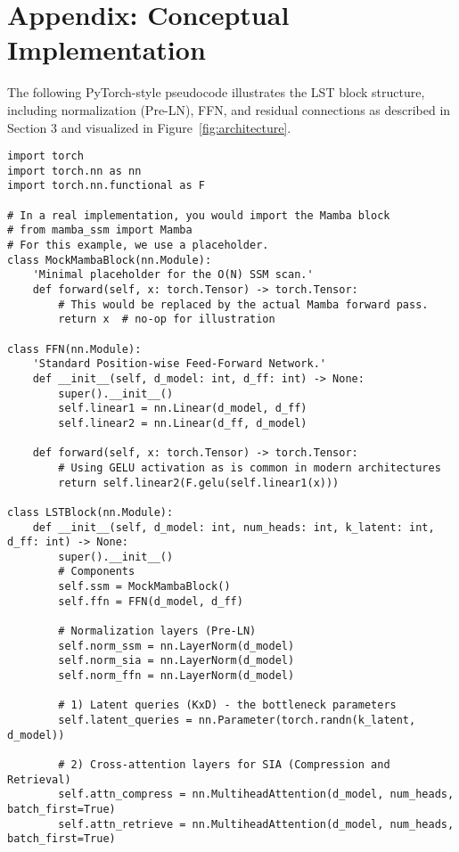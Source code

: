 \documentclass[10pt,twocolumn,letterpaper]{article}
\begin{document}



\appendix

\section{Appendix: Conceptual Implementation}

The following PyTorch-style pseudocode illustrates the LST block structure, including normalization (Pre-LN), FFN, and residual connections as described in Section 3 and visualized in Figure~\ref{fig:architecture}.

\begin{lstlisting}[style=pytorchstyle, caption={PyTorch-style pseudocode for the LST Block.}, label=lst:code_block]
import torch
import torch.nn as nn
import torch.nn.functional as F

# In a real implementation, you would import the Mamba block
# from mamba_ssm import Mamba
# For this example, we use a placeholder.
class MockMambaBlock(nn.Module):
    'Minimal placeholder for the O(N) SSM scan.'
    def forward(self, x: torch.Tensor) -> torch.Tensor:
        # This would be replaced by the actual Mamba forward pass.
        return x  # no-op for illustration

class FFN(nn.Module):
    'Standard Position-wise Feed-Forward Network.'
    def __init__(self, d_model: int, d_ff: int) -> None:
        super().__init__()
        self.linear1 = nn.Linear(d_model, d_ff)
        self.linear2 = nn.Linear(d_ff, d_model)

    def forward(self, x: torch.Tensor) -> torch.Tensor:
        # Using GELU activation as is common in modern architectures
        return self.linear2(F.gelu(self.linear1(x)))

class LSTBlock(nn.Module):
    def __init__(self, d_model: int, num_heads: int, k_latent: int, d_ff: int) -> None:
        super().__init__()
        # Components
        self.ssm = MockMambaBlock()
        self.ffn = FFN(d_model, d_ff)

        # Normalization layers (Pre-LN)
        self.norm_ssm = nn.LayerNorm(d_model)
        self.norm_sia = nn.LayerNorm(d_model)
        self.norm_ffn = nn.LayerNorm(d_model)

        # 1) Latent queries (KxD) - the bottleneck parameters
        self.latent_queries = nn.Parameter(torch.randn(k_latent, d_model))

        # 2) Cross-attention layers for SIA (Compression and Retrieval)
        self.attn_compress = nn.MultiheadAttention(d_model, num_heads, batch_first=True)
        self.attn_retrieve = nn.MultiheadAttention(d_model, num_heads, batch_first=True)


\end{lstlisting}
\end{document}
